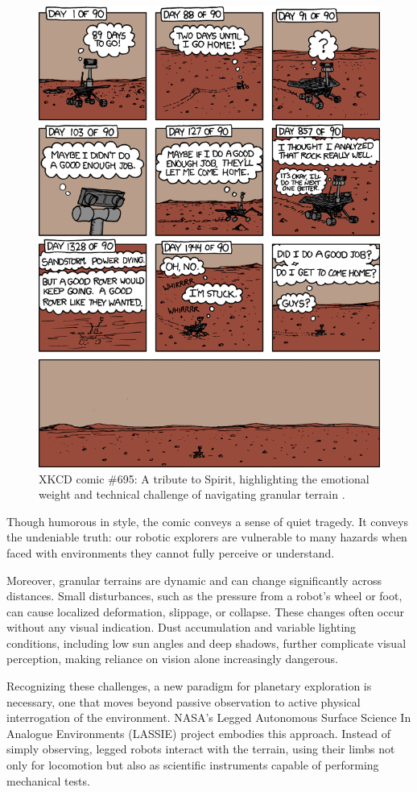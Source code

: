 \begin{figure}[htbp]
    \centering
    \includegraphics[width=0.7\linewidth]{figures/xkcd_spirit.png}
    \caption{XKCD comic \#695: A tribute to Spirit, highlighting the emotional weight and technical challenge of navigating granular terrain \cite{xkcdspirit}.}
    \label{fig:xkcd_spirit}
\end{figure}

Though humorous in style, the comic conveys a sense of quiet tragedy. It conveys the undeniable truth: our robotic explorers are vulnerable to many hazards when faced with environments they cannot fully perceive or understand.

Moreover, granular terrains are dynamic and can change significantly across distances. Small disturbances, such as the pressure from a robot’s wheel or foot, can cause localized deformation, slippage, or collapse. These changes often occur without any visual indication. Dust accumulation and variable lighting conditions, including low sun angles and deep shadows, further complicate visual perception, making reliance on vision alone increasingly dangerous.

Recognizing these challenges, a new paradigm for planetary exploration is necessary, one that moves beyond passive observation to active physical interrogation of the environment. NASA’s Legged Autonomous Surface Science In Analogue Environments (LASSIE) project \cite{Fisher2023LASSIE} embodies this approach. Instead of simply observing, legged robots interact with the terrain, using their limbs not only for locomotion but also as scientific instruments capable of performing mechanical tests.

